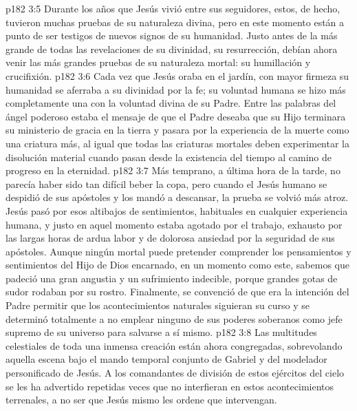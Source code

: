 \vs p182 3:5 \pc Durante los años que Jesús vivió entre sus seguidores, estos, de hecho, tuvieron muchas pruebas de su naturaleza divina, pero en este momento están a punto de ser testigos de nuevos signos de su humanidad. Justo antes de la más grande de todas las revelaciones de su divinidad, su resurrección, debían ahora venir las más grandes pruebas de su naturaleza mortal: su humillación y crucifixión.
\vs p182 3:6 Cada vez que Jesús oraba en el jardín, con mayor firmeza su humanidad se aferraba a su divinidad por la fe; su voluntad humana se hizo más completamente una con la voluntad divina de su Padre. Entre las palabras del ángel poderoso estaba el mensaje de que el Padre deseaba que su Hijo terminara su ministerio de gracia en la tierra y pasara por la experiencia de la muerte como una criatura más, al igual que todas las criaturas mortales deben experimentar la disolución material cuando pasan desde la existencia del tiempo al camino de progreso en la eternidad.
\vs p182 3:7 Más temprano, a última hora de la tarde, no parecía haber sido tan difícil beber la copa, pero cuando el Jesús humano se despidió de sus apóstoles y los mandó a descansar, la prueba se volvió más atroz. Jesús pasó por esos altibajos de sentimientos, habituales en cualquier experiencia humana, y justo en aquel momento estaba agotado por el trabajo, exhausto por las largas horas de ardua labor y de dolorosa ansiedad por la seguridad de sus apóstoles. Aunque ningún mortal puede pretender comprender los pensamientos y sentimientos del Hijo de Dios encarnado, en un momento como este, sabemos que padeció una gran angustia y un sufrimiento indecible, porque grandes gotas de sudor rodaban por su rostro. Finalmente, se convenció de que era la intención del Padre permitir que los acontecimientos naturales siguieran su curso y se determinó totalmente a no emplear ninguno de sus poderes soberanos como jefe supremo de su universo para salvarse a sí mismo.
\vs p182 3:8 Las multitudes celestiales de toda una inmensa creación están ahora congregadas, sobrevolando aquella escena bajo el mando temporal conjunto de Gabriel y del modelador personificado de Jesús. A los comandantes de división de estos ejércitos del cielo se les ha advertido repetidas veces que no interfieran en estos acontecimientos terrenales, a no ser que Jesús mismo les ordene que intervengan.
